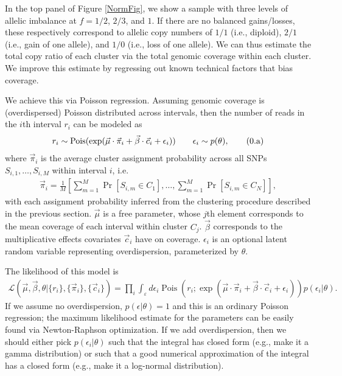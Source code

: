\documentclass[10pt,letter]{article}
\numberwithin{equation}{section}
\newcommand{\rt}{\right}
\newcommand{\lt}{\left}
\newcommand{\btag}[1]{\addtocounter{equation}{1}\label{#1}\tag{\arabic{section}.\alph{equation}}}
\newcommand{\textop}[1]{\operatorname{#1}}
\begin{document}
In the top panel of Figure \ref{NormFig}, we show a sample with three levels of allelic imbalance at $f=1/2$, $2/3$, and $1$. If there are no balanced gains/losses, these respectively correspond to allelic copy numbers of $1/1$ (i.e., diploid), $2/1$ (i.e., gain of one allele), and $1/0$ (i.e., loss of one allele). We can thus estimate the total copy ratio of each cluster via the total genomic coverage within each cluster. We improve this estimate by regressing out known technical factors that bias coverage.

We achieve this via Poisson regression. Assuming genomic coverage is (overdispersed) Poisson distributed across intervals, then the number of reads in the $i$th interval $r_i$ can be modeled as
\begin{align*}
r_i \sim \textop{Pois}(\exp(\vec\mu\cdot\vec \pi_i + \vec\beta\cdot\vec c_i + \epsilon_i))\qquad \epsilon_i\sim p(\theta),\btag{poiss0}
\end{align*}
where $\vec\pi_i$ is the average cluster assignment probability across all SNPs $S_{i,1},\dots,S_{i,M}$ within interval $i$, i.e.
\begin{align*}
\vec \pi_i=\frac{1}{M}\lt[\sum_{m=1}^M\textop{Pr}[S_{i,m}\in C_1],\dots,\sum_{m=1}^M\textop{Pr}[S_{i,m}\in C_N]\rt],
\end{align*}
with each assignment probability inferred from the clustering procedure described in the previous section. $\vec\mu$ is a free parameter, whose $j$th element corresponds to the mean coverage of each interval within cluster $C_j$. $\vec\beta$ corresponds to the multiplicative effects covariates $\vec c_i$ have on coverage. $\epsilon_i$ is an optional latent random variable representing overdispersion, parameterized by $\theta$.

The likelihood of this model is
\begin{align*}
\mathcal{L}(\vec \mu,\vec\beta,\theta|\{r_i\},\{\vec \pi_i\},\{\vec c_i\}) = \prod_i \int_{\varepsilon} d\epsilon_i \textop{Pois}(r_i;\exp(\vec\mu\cdot\vec \pi_i + \vec\beta\cdot\vec c_i + \epsilon_i))p(\epsilon_i|\theta).
\end{align*}
If we assume no overdispersion, $p(\epsilon|\theta)=1$ and this is an ordinary Poisson regression; the maximum likelihood estimate for the parameters can be easily found via Newton-Raphson optimization. If we add overdispersion, then we should either pick $p(\epsilon_i|\theta)$ such that the integral has closed form (e.g., make it a gamma distribution) or such that a good numerical approximation of the integral has a closed form (e.g., make it a log-normal distribution).
\end{document}
